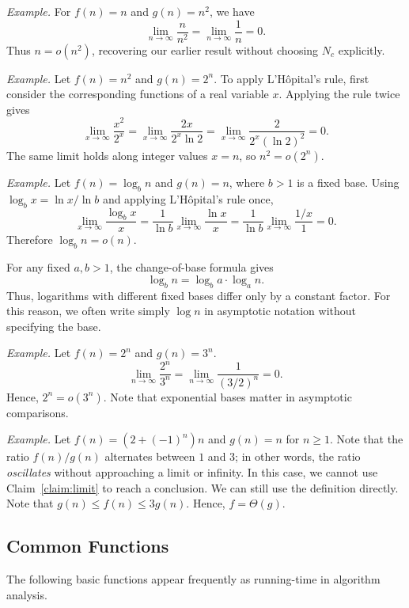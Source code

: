 \emph{Example.} For $f(n)=n$ and $g(n)=n^2$, we have
\[
    \lim_{n\to\infty}\frac{n}{n^2}
    =\lim_{n\to\infty}\frac{1}{n}=0.
\]
Thus $n=o(n^2)$, recovering our earlier result without choosing $N_c$ explicitly.

\emph{Example.} Let $f(n)=n^2$ and $g(n)=2^n$. To apply L'H\^opital's rule,
first consider the corresponding functions of a real variable $x$. Applying
the rule twice gives
\[
    \lim_{x\to\infty}\frac{x^2}{2^x}
    =\lim_{x\to\infty}\frac{2x}{2^x\ln 2}
    =\lim_{x\to\infty}\frac{2}{2^x(\ln 2)^2}=0.
\]
The same limit holds along integer values $x=n$, so $n^2=o(2^n)$.

\emph{Example.} Let $f(n)=\log_b n$ and $g(n)=n$, where $b>1$ is a fixed
base. Using $\log_b x=\ln x/\ln b$ and applying L'H\^opital's rule once,
\[
    \lim_{x\to\infty}\frac{\log_b x}{x}
    =\frac{1}{\ln b}\lim_{x\to\infty}\frac{\ln x}{x}
    =\frac{1}{\ln b}\lim_{x\to\infty}\frac{1/x}{1}=0.
\]
Therefore $\log_b n=o(n)$.

For any fixed $a,b>1$, the change-of-base formula gives
  \[ \log_b n = \log_b a \cdot \log_a n. \]
  Thus, logarithms with different fixed bases differ only by a constant factor.
  For this reason, we often write simply $\log n$ in asymptotic notation
  without specifying the base.

\emph{Example.} Let $f(n) = 2^n$ and $g(n) = 3^n$.
\[
    \lim_{n\to\infty}\frac{2^n}{3^n}
    =\lim_{n\to\infty}\frac{1}{(3/2)^n} = 0.
\]
Hence, $2^n = o(3^n)$.
Note that exponential bases matter in asymptotic comparisons.


\emph{Example.} Let $f(n)=(2+(-1)^n)n$ and $g(n)=n$ for $n\ge 1$.
Note that the ratio $f(n)/g(n)$ alternates between $1$ and $3$; in other words,
the ratio \emph{oscillates} without approaching a limit or infinity.
In this case, we cannot use Claim~\ref{claim:limit} to reach a conclusion.
We can still use the definition directly.
Note that $g(n)\le f(n)\le 3 g(n)$. Hence, $f=\Theta(g)$.


\subsection*{Common Functions}

The following basic functions appear frequently as running-time in algorithm analysis.

